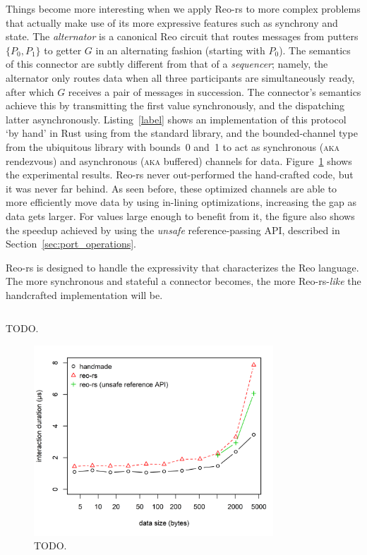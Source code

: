 Things become more interesting when we apply Reo-rs to more complex problems that actually make use of its more expressive features such as synchrony and state. The \textit{alternator} is a canonical Reo circuit that routes messages from putters $\{P_0, P_1\}$ to getter $G$ in an alternating fashion (starting with $P_0$). The semantics of this connector are subtly different from that of a \textit{sequencer}; namely, the alternator only routes data when all three participants are simultaneously ready, after which $G$ receives a pair of messages in succession. The connector's semantics achieve this by transmitting the first value synchronously, and the dispatching latter asynchronously.
Listing~\ref{label} shows an implementation of this protocol `by hand' in Rust using  from the standard library, and the bounded-channel type from the ubiquitous  library with bounds~0 and~1 to act as synchronous (\textsc{aka} rendezvous) and asynchronous (\textsc{aka} buffered) channels for data. Figure~\ref{fig:alternator} shows the experimental results. Reo-rs never out-performed the hand-crafted code, but it was never far behind. As seen before, these optimized channels are able to more efficiently move data by using in-lining optimizations, increasing the gap as data gets larger. For values large enough to benefit from it, the figure also shows the speedup achieved by using the \textit{unsafe} reference-passing API, described in Section~\ref{sec:port_operations}.

Reo-rs is designed to handle the expressivity that characterizes the Reo language. The more synchronous and stateful a connector becomes, the more Reo-rs-\textit{like} the handcrafted implementation will be.

\begin{listing}[h!]
	\centering
	\inputminted{text}{mpsc_pop.txt}
	\caption[TODO.]{TODO.}
	\label{listing:mpsc_pop}
\end{listing}

\begin{figure}
	\centering
	\includegraphics[width=0.80\textwidth]{experiments/alternator.png}
	\caption[Hand-crafted vs.\ Reo-generated Alternator.]{TODO.}
	\label{fig:alternator}
\end{figure}


